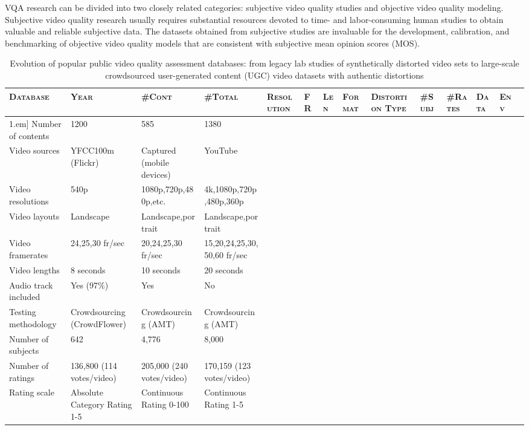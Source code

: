 \documentclass[journal]{IEEEtran}
\begin{document}
VQA research can be divided into two closely related categories: subjective video quality studies and objective video quality modeling. Subjective video quality research usually requires substantial resources devoted to time- and labor-consuming human studies to obtain valuable and reliable subjective data. The datasets obtained from subjective studies are invaluable for the development, calibration, and benchmarking of objective video quality models that are consistent with subjective mean opinion scores (MOS).
\begin{table*}[!t]
\setlength{\tabcolsep}{2.5pt}
\renewcommand{\arraystretch}{1.1}
\centering
\begin{threeparttable}
\caption{Evolution of popular public video quality assessment databases: from legacy lab studies of synthetically distorted video sets to large-scale crowdsourced user-generated content (UGC) video datasets with authentic distortions}
\label{table:db_comp}
\begin{tabular}{llllllllp{3.5cm}lllll}
\toprule
\textsc{Database}          & \textsc{Year} & \textsc{\#Cont} & \textsc{\#Total} & \textsc{Resolution} & \textsc{FR} & \textsc{Len} & \textsc{Format}      & \textsc{Distortion Type}                                                                  & \textsc{\#Subj} & \textsc{\#Rates}  & \textsc{Data}          & \textsc{Env}   \\
\hline\-1.em]
Number of contents & 1200 & 585  & 1380 \\
Video sources & YFCC100m (Flickr) & Captured (mobile devices) & YouTube \\
Video resolutions & 540p & 1080p,720p,480p,etc. & 4k,1080p,720p,480p,360p \\
Video layouts & Landscape & Landscape,portrait & Landscape,portrait \\
Video framerates & 24,25,30 fr/sec & 20,24,25,30 fr/sec & 15,20,24,25,30,50,60 fr/sec \\
Video lengths & 8 seconds & 10 seconds & 20 seconds \\
Audio track included & Yes (97\%) & Yes & No \\
Testing methodology & Crowdsourcing (CrowdFlower) & Crowdsourcing (AMT) & Crowdsourcing (AMT) \\
Number of subjects & 642 & 4,776 & 8,000 \\
Number of ratings & 136,800 (114 votes/video) & 205,000 (240 votes/video) & 170,159 (123 votes/video) \\
Rating scale & Absolute Category Rating 1-5 & Continuous Rating 0-100 & Continuous Rating 1-5 \\

\end{tabular}
\end{threeparttable}
\end{table*}
\end{document}
